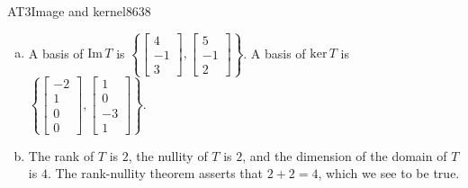 \begin{exercise}{AT3}{Image and kernel}{8638}
\begin{exerciseAnswer}
\begin{enumerate}[(a)]
 
\item  

 A basis of \(\mathrm{Im}\,T\) is \(\left\{ \left[\begin{array}{c}
4 \\
-1 \\
3
\end{array}\right] , \left[\begin{array}{c}
5 \\
-1 \\
2
\end{array}\right] \right\}\). A basis of \(\mathrm{ker}\,T\) is \(\left\{ \left[\begin{array}{c}
-2 \\
1 \\
0 \\
0
\end{array}\right] , \left[\begin{array}{c}
1 \\
0 \\
-3 \\
1
\end{array}\right] \right\}\). 

 
\item  

 The rank of \(T\) is \(2\), the nullity of \(T\) is \(2\), and the dimension of the domain of \(T\) is \(4\). The rank-nullity theorem asserts that \(2+2=4\), which we see to be true. 

 
\end{enumerate}

     \end{exerciseAnswer}
 \end{exercise}


